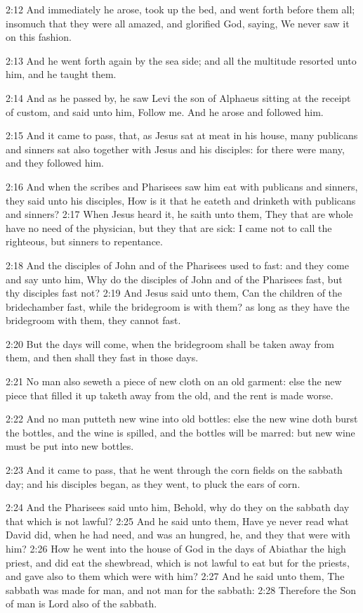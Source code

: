 2:12 And immediately he arose, took up the bed, and went forth before
them all; insomuch that they were all amazed, and glorified God,
saying, We never saw it on this fashion.

2:13 And he went forth again by the sea side; and all the multitude
resorted unto him, and he taught them.

2:14 And as he passed by, he saw Levi the son of Alphaeus sitting at
the receipt of custom, and said unto him, Follow me. And he arose and
followed him.

2:15 And it came to pass, that, as Jesus sat at meat in his house,
many publicans and sinners sat also together with Jesus and his
disciples: for there were many, and they followed him.

2:16 And when the scribes and Pharisees saw him eat with publicans and
sinners, they said unto his disciples, How is it that he eateth and
drinketh with publicans and sinners?  2:17 When Jesus heard it, he
saith unto them, They that are whole have no need of the physician,
but they that are sick: I came not to call the righteous, but sinners
to repentance.

2:18 And the disciples of John and of the Pharisees used to fast: and
they come and say unto him, Why do the disciples of John and of the
Pharisees fast, but thy disciples fast not?  2:19 And Jesus said unto
them, Can the children of the bridechamber fast, while the bridegroom
is with them? as long as they have the bridegroom with them, they
cannot fast.

2:20 But the days will come, when the bridegroom shall be taken away
from them, and then shall they fast in those days.

2:21 No man also seweth a piece of new cloth on an old garment: else
the new piece that filled it up taketh away from the old, and the rent
is made worse.

2:22 And no man putteth new wine into old bottles: else the new wine
doth burst the bottles, and the wine is spilled, and the bottles will
be marred: but new wine must be put into new bottles.

2:23 And it came to pass, that he went through the corn fields on the
sabbath day; and his disciples began, as they went, to pluck the ears
of corn.

2:24 And the Pharisees said unto him, Behold, why do they on the
sabbath day that which is not lawful?  2:25 And he said unto them,
Have ye never read what David did, when he had need, and was an
hungred, he, and they that were with him?  2:26 How he went into the
house of God in the days of Abiathar the high priest, and did eat the
shewbread, which is not lawful to eat but for the priests, and gave
also to them which were with him?  2:27 And he said unto them, The
sabbath was made for man, and not man for the sabbath: 2:28 Therefore
the Son of man is Lord also of the sabbath.

